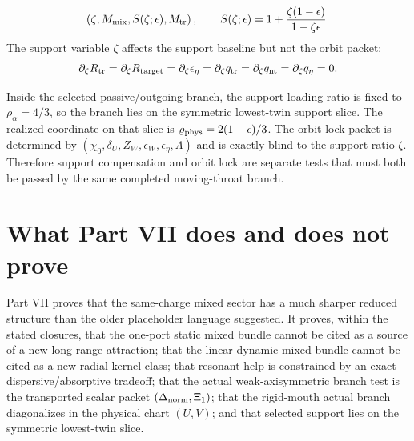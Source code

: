 \begin{equation}
\label{eq:app-part07-stage242-support-packet}
\left(\zeta,
M_{\rm mix},
S(\zeta;\epsilon),
M_{\rm tr}
\right),
\qquad
S(\zeta;\epsilon)=1+\frac{\zeta(1-\epsilon)}{1-\zeta\epsilon}.
\end{equation}
The support variable \(\zeta\) affects the support baseline but not the orbit packet:
\begin{equation}
\label{eq:app-part07-zeta-orbit-blind}
\partial_\zeta R_{\rm tr}
=
\partial_\zeta R_{\rm target}
=
\partial_\zeta\epsilon_\eta
=
\partial_\zeta q_{\rm tr}
=
\partial_\zeta q_{\rm nt}
=
\partial_\zeta q_\eta
=0.
\end{equation}

\begin{theorem}
\label{thm:app-part07-selected-twin-placement}
Inside the selected passive/outgoing branch, the support loading ratio is fixed to \(\rho_\alpha=4/3\), so the branch lies on the symmetric lowest-twin support slice.  The realized coordinate on that slice is \(\varrho_{\rm phys}=2(1-\epsilon)/3\).  The orbit-lock packet is determined by \((\chi_0,\delta_U,Z_W,\epsilon_W,\epsilon_\eta,\Lambda)\) and is exactly blind to the support ratio \(\zeta\).  Therefore support compensation and orbit lock are separate tests that must both be passed by the same completed moving-throat branch.
\end{theorem}


\section{What Part VII does and does not prove}
\label{sec:app-part07-what-it-does-not-prove}

Part VII proves that the same-charge mixed sector has a much sharper reduced structure than the older placeholder language suggested.  It proves, within the stated closures, that the one-port static mixed bundle cannot be cited as a source of a new long-range attraction; that the linear dynamic mixed bundle cannot be cited as a new radial kernel class; that resonant help is constrained by an exact dispersive/absorptive tradeoff; that the actual weak-axisymmetric branch test is the transported scalar packet \((\Delta_{\rm norm},\Xi_1)\); that the rigid-mouth actual branch diagonalizes in the physical chart \((U,V)\); and that selected support lies on the symmetric lowest-twin slice.

